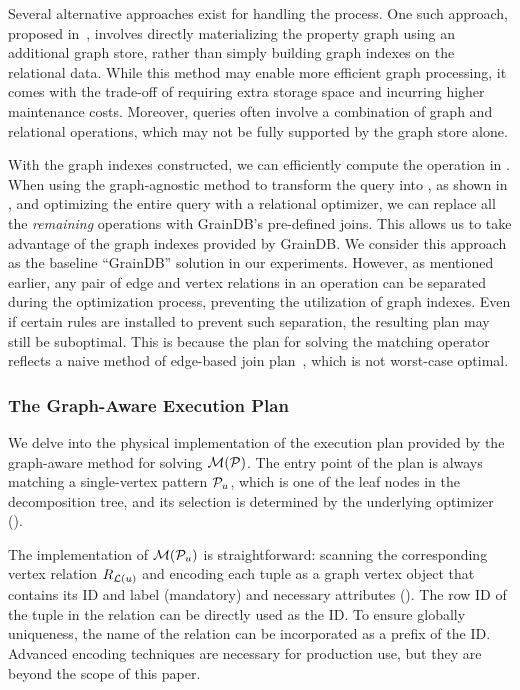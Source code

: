 \begin{remark}
  Several alternative approaches exist for handling the \rgmapping process. One such approach, proposed in~\cite{gart}, involves directly materializing the property graph using an additional graph store, rather than simply building graph indexes on the relational data. While this method may enable more efficient graph processing, it comes with the trade-off of requiring extra storage space and incurring higher maintenance costs. Moreover, \spjm queries often involve a combination of graph and relational operations, which may not be fully supported by the graph store alone.
\end{remark}

With the graph indexes constructed, we can efficiently compute the \EVjoin operation in .
When using the graph-agnostic method to transform the \spjm query into \spj, as shown in , and optimizing the entire \spj query with a relational optimizer, we can replace all the \emph{remaining} \EVjoin operations with GrainDB's pre-defined joins. This allows us to take advantage of the graph indexes provided by GrainDB. We consider this approach as the baseline ``GrainDB'' solution in our experiments.
However, as mentioned earlier, any pair of edge and vertex relations in an \EVjoin operation can be separated during the optimization process, preventing the utilization of graph indexes. Even if certain rules are installed to prevent such separation, the resulting plan may still be suboptimal. This is because the plan for solving the matching operator reflects a naive method of edge-based join plan~\cite{lai2019distributed}, which is not worst-case optimal. 

\subsubsection{The Graph-Aware Execution Plan}
\label{sec:join-matching-operator}
We delve into the physical implementation of the execution plan provided by the graph-aware method for solving $\mathcal{M}(\mathcal{P})$. The entry point of the plan is always matching a single-vertex pattern $\mathcal{P}_u$, which is one of the leaf nodes in the decomposition tree, and its selection is determined by the underlying optimizer ().

 The implementation of $\mathcal{M}(\mathcal{P}_u)$ is straightforward: scanning the corresponding vertex relation ${R_{\mathcal{L}(u)}}$ and encoding each tuple as a graph vertex object that contains its ID and label (mandatory) and necessary attributes (). The row ID of the tuple in the relation can be directly used as the ID. To ensure globally uniqueness, the name of the relation can be incorporated as a prefix of the ID. Advanced encoding techniques are necessary for production use, but they are beyond the scope of this paper.

